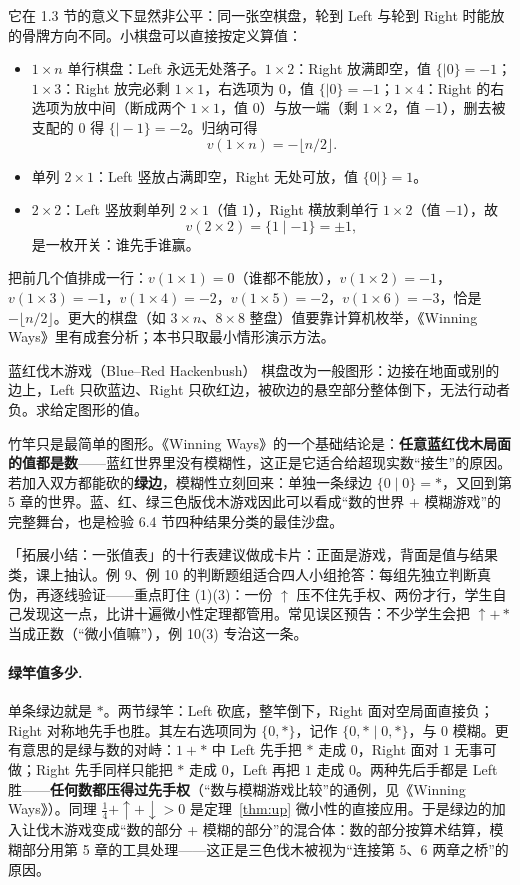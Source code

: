 它在 1.3 节的意义下显然非公平：同一张空棋盘，轮到 Left 与轮到 Right 时能放的骨牌方向不同。小棋盘可以直接按定义算值：
\begin{itemize}
\item $1\times n$ 单行棋盘：Left 永远无处落子。$1\times2$：Right 放满即空，值 $\{\mid 0\}=-1$；$1\times3$：Right 放完必剩 $1\times1$，右选项为 $0$，值 $\{\mid 0\}=-1$；$1\times4$：Right 的右选项为放中间（断成两个 $1\times1$，值 $0$）与放一端（剩 $1\times2$，值 $-1$），删去被支配的 $0$ 得 $\{\mid -1\}=-2$。归纳可得
\[
 v(1\times n)=-\bigl\lfloor n/2\bigr\rfloor .
\]
\item 单列 $2\times1$：Left 竖放占满即空，Right 无处可放，值 $\{0\mid\}=1$。
\item $2\times2$：Left 竖放剩单列 $2\times1$（值 $1$），Right 横放剩单行 $1\times2$（值 $-1$），故
\[
 v(2\times2)=\{1\mid -1\}=\pm1 ,
\]
是一枚开关：谁先手谁赢。
\end{itemize}
把前几个值排成一行：$v(1\times1)=0$（谁都不能放），$v(1\times2)=-1$，$v(1\times3)=-1$，$v(1\times4)=-2$，$v(1\times5)=-2$，$v(1\times6)=-3$，恰是 $-\lfloor n/2\rfloor$。更大的棋盘（如 $3\times n$、$8\times8$ 整盘）值要靠计算机枚举，《Winning Ways》里有成套分析；本书只取最小情形演示方法。

\begin{problem}{蓝红伐木游戏（Blue--Red Hackenbush）}
棋盘改为一般图形：边接在地面或别的边上，Left 只砍蓝边、Right 只砍红边，被砍边的悬空部分整体倒下，无法行动者负。求给定图形的值。
\end{problem}

竹竿只是最简单的图形。《Winning Ways》的一个基础结论是：\textbf{任意蓝红伐木局面的值都是数}——蓝红世界里没有模糊性，这正是它适合给超现实数“接生”的原因。若加入双方都能砍的\textbf{绿边}，模糊性立刻回来：单独一条绿边 $\{0\mid 0\}=\ast$，又回到第 5 章的世界。蓝、红、绿三色版伐木游戏因此可以看成“数的世界 + 模糊游戏”的完整舞台，也是检验 6.4 节四种结果分类的最佳沙盘。

\begin{teach}[值表与判断题组的课堂用法]
「拓展小结：一张值表」的十行表建议做成卡片：正面是游戏，背面是值与结果类，课上抽认。例 9、例 10 的判断题组适合四人小组抢答：每组先独立判断真伪，再逐线验证——重点盯住 (1)(3)：一份 $\uparrow$ 压不住先手权、两份才行，学生自己发现这一点，比讲十遍微小性定理都管用。常见误区预告：不少学生会把 $\uparrow+\ast$ 当成正数（“微小值嘛”），例 10(3) 专治这一条。
\end{teach}
\paragraph{绿竿值多少.} 单条绿边就是 $\ast$。两节绿竿：Left 砍底，整竿倒下，Right 面对空局面直接负；Right 对称地先手也胜。其左右选项同为 $\{0,\ast\}$，记作 $\{0,\ast\mid 0,\ast\}$，与 $0$ 模糊。更有意思的是绿与数的对峙：$1+\ast$ 中 Left 先手把 $\ast$ 走成 $0$，Right 面对 $1$ 无事可做；Right 先手同样只能把 $\ast$ 走成 $0$，Left 再把 $1$ 走成 $0$。两种先后手都是 Left 胜——\textbf{任何数都压得过先手权}（“数与模糊游戏比较”的通例，见《Winning Ways》）。同理 $\tfrac14+\uparrow+\downarrow>0$ 是定理~\ref{thm:up} 微小性的直接应用。于是绿边的加入让伐木游戏变成“数的部分 + 模糊的部分”的混合体：数的部分按算术结算，模糊部分用第 5 章的工具处理——这正是三色伐木被视为“连接第 5、6 两章之桥”的原因。

